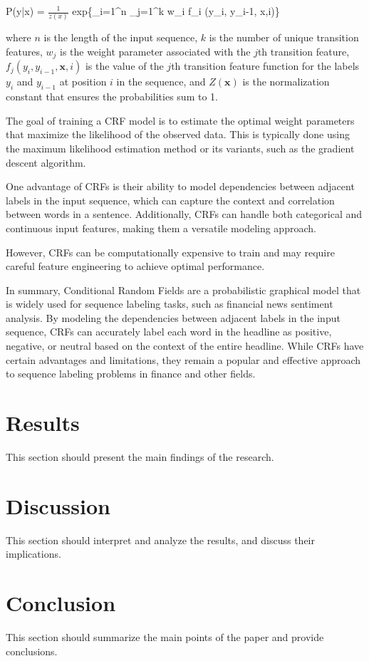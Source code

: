 \documentclass{article}
\begin{document}
P(y|x) = $\frac{1}{z(x)}$     exp\left\{\sum_{i=1}^{n} \sum_{j=1}^{k} w_i f_i (y_i, y_{i-1}, x,i)\right\}


where $n$ is the length of the input sequence, $k$ is the number of unique transition features, $w_j$ is the weight parameter associated with the $j$th transition feature, $f_j(y_i, y_{i-1}, \mathbf{x}, i)$ is the value of the $j$th transition feature function for the labels $y_i$ and $y_{i-1}$ at position $i$ in the sequence, and $Z(\mathbf{x})$ is the normalization constant that ensures the probabilities sum to 1.

The goal of training a CRF model is to estimate the optimal weight parameters that maximize the likelihood of the observed data. This is typically done using the maximum likelihood estimation method or its variants, such as the gradient descent algorithm.

One advantage of CRFs is their ability to model dependencies between adjacent labels in the input sequence, which can capture the context and correlation between words in a sentence. Additionally, CRFs can handle both categorical and continuous input features, making them a versatile modeling approach.

However, CRFs can be computationally expensive to train and may require careful feature engineering to achieve optimal performance.

In summary, Conditional Random Fields are a probabilistic graphical model that is widely used for sequence labeling tasks, such as financial news sentiment analysis. By modeling the dependencies between adjacent labels in the input sequence, CRFs can accurately label each word in the headline as positive, negative, or neutral based on the context of the entire headline. While CRFs have certain advantages and limitations, they remain a popular and effective approach to sequence labeling problems in finance and other fields.

\section{Results}
This section should present the main findings of the research.

\section{Discussion}
This section should interpret and analyze the results, and discuss their implications.

\section{Conclusion}
This section should summarize the main points of the paper and provide conclusions.



\end{document}
